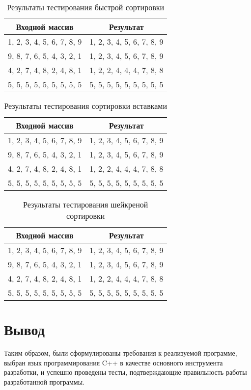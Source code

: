 \begin{table}[H]
    \centering
    \caption{Результаты тестирования быстрой сортировки}
    \label{table:qsres}
    \begin{tabular}{|c|c|}
        \hline
        Входной массив & Результат \\
        \hline
        1, 2, 3, 4, 5, 6, 7, 8, 9 & 1, 2, 3, 4, 5, 6, 7, 8, 9 \\
        \hline
        9, 8, 7, 6, 5, 4, 3, 2, 1 & 1, 2, 3, 4, 5, 6, 7, 8, 9 \\
        \hline
        4, 2, 7, 4, 8, 2, 4, 8, 1 & 1, 2, 2, 4, 4, 4, 7, 8, 8 \\
        \hline
        5, 5, 5, 5, 5, 5, 5, 5, 5 & 5, 5, 5, 5, 5, 5, 5, 5, 5 \\
        \hline
    \end{tabular}
\end{table}

\begin{table}[H]
    \centering
    \caption{Результаты тестирования сортировки вставками}
    \label{table:inres}
    \begin{tabular}{|c|c|}
        \hline
        Входной массив & Результат \\
        \hline
        1, 2, 3, 4, 5, 6, 7, 8, 9 & 1, 2, 3, 4, 5, 6, 7, 8, 9 \\
        \hline
        9, 8, 7, 6, 5, 4, 3, 2, 1 & 1, 2, 3, 4, 5, 6, 7, 8, 9 \\
        \hline
        4, 2, 7, 4, 8, 2, 4, 8, 1 & 1, 2, 2, 4, 4, 4, 7, 8, 8 \\
        \hline
        5, 5, 5, 5, 5, 5, 5, 5, 5 & 5, 5, 5, 5, 5, 5, 5, 5, 5 \\
        \hline
    \end{tabular}
\end{table}

\begin{table}[H]
    \centering
    \caption{Результаты тестирования шейкреной сортировки}
    \label{table:shres}
    \begin{tabular}{|c|c|}
        \hline
        Входной массив & Результат \\
        \hline
        1, 2, 3, 4, 5, 6, 7, 8, 9 & 1, 2, 3, 4, 5, 6, 7, 8, 9 \\
        \hline
        9, 8, 7, 6, 5, 4, 3, 2, 1 & 1, 2, 3, 4, 5, 6, 7, 8, 9 \\
        \hline
        4, 2, 7, 4, 8, 2, 4, 8, 1 & 1, 2, 2, 4, 4, 4, 7, 8, 8 \\
        \hline
        5, 5, 5, 5, 5, 5, 5, 5, 5 & 5, 5, 5, 5, 5, 5, 5, 5, 5 \\
        \hline
    \end{tabular}
\end{table}


\section{Вывод}
Таким образом, были сформулированы требования к реализуемой программе, выбран язык программирования C++ в качестве основного инструмента разработки, и успешно проведены тесты, подтверждающие правильность работы разработанной программы.

